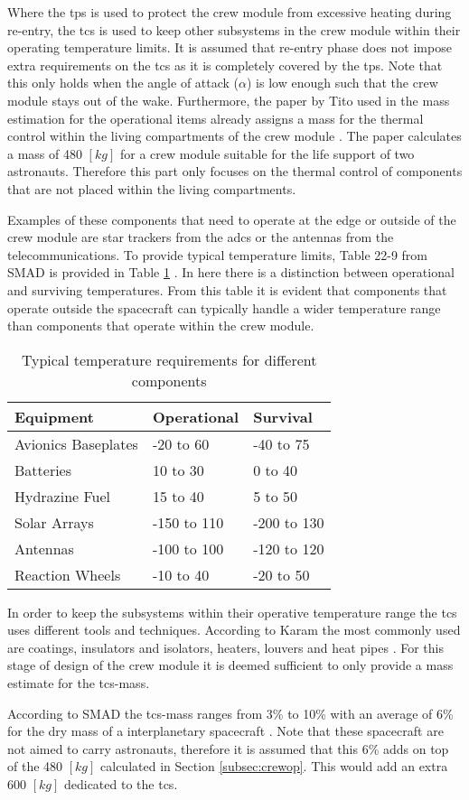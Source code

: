 Where the \acrfull{tps} is used to protect the crew module from excessive heating during re-entry, the \acrfull{tcs} is used to keep other subsystems in the crew module within their operating temperature limits. It is assumed that re-entry phase does not impose extra requirements on the \gls{tcs} as it is completely covered by the \gls{tps}. Note that this only holds when the angle of attack ($\alpha$) is low enough such that the crew module stays out of the wake. Furthermore, the paper by Tito used in the mass estimation for the operational items already assigns a mass for the thermal control within the living compartments of the crew module \cite{Tito2013}. The paper calculates a mass of 480 $[kg]$ for a crew module suitable for the life support of two astronauts. Therefore this part only focuses on the thermal control of components that are not placed within the living compartments.

Examples of these components that need to operate at the edge or outside of the crew module are star trackers from the \gls{adcs} or the antennas from the telecommunications. To provide typical temperature limits, Table 22-9 from SMAD is provided in Table \ref{tab:cmtherm} \cite{Wertz2011}. In here there is a distinction between operational and surviving temperatures. From this table it is evident that components that operate outside the spacecraft can typically handle a wider temperature range than components that operate within the crew module.

\begin{table}[h]
	\centering
	\caption{Typical temperature requirements for different components}
	\begin{tabular}{|l|ll|}
		\hline
		\textbf{Equipment} & \textbf{Operational} & \textbf{Survival}\\ \hline \hline
		Avionics Baseplates & -20 to 60 & -40 to 75 \\
		Batteries & 10 to 30 & 0 to 40 \\
		Hydrazine Fuel & 15 to 40 & 5 to 50 \\
		Solar Arrays & -150 to 110 & -200 to 130 \\
		Antennas & -100 to 100 & -120 to 120 \\
		Reaction Wheels & -10 to 40 & -20 to 50 \\
		\hline
	\end{tabular}
	\label{tab:cmtherm}
\end{table}

In order to keep the subsystems within their operative temperature range the \gls{tcs} uses different tools and techniques. According to Karam the most commonly used are coatings, insulators and isolators, heaters, louvers and heat pipes \cite{Karam1998}. For this stage of design of the crew module it is deemed sufficient to only provide a mass estimate for the \gls{tcs}-mass.

According to SMAD the \gls{tcs}-mass ranges from 3\% to 10\% with an average of 6\% for the dry mass of a interplanetary spacecraft \cite{Wertz2011}. Note that these spacecraft are not aimed to carry astronauts, therefore it is assumed that this 6\% adds on top of the 480 $[kg]$ calculated in Section \ref{subsec:crewop}. This would add an extra 600 $[kg]$ dedicated to the \gls{tcs}.
